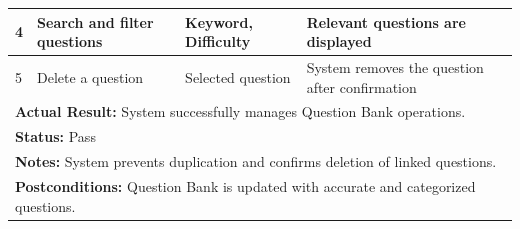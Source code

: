 \documentclass[12pt]{article}
\begin{document}
\begin{table}[H]
{\begin{tabular}{|p{3.3cm}|p{5.1cm}|p{3.3cm}|p{5.1cm}|}
4 & Search and filter questions & Keyword, Difficulty &
Relevant questions are displayed \\ \hline

5 & Delete a question & Selected question &
System removes the question after confirmation \\ \hline

\multicolumn{4}{|l|}{\textbf{Actual Result:}
System successfully manages Question Bank operations.} \\ \hline

\multicolumn{4}{|l|}{\textbf{Status:} Pass} \\ \hline

\multicolumn{4}{|l|}{\textbf{Notes:}
System prevents duplication and confirms deletion of linked questions.} \\ \hline

\multicolumn{4}{|l|}{\textbf{Postconditions:}
Question Bank is updated with accurate and categorized questions.} \\ \hline

\end{tabular}
}
\end{table}
\end{document}
